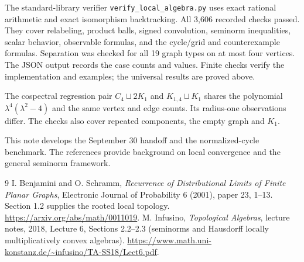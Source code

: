 \documentclass[11pt]{article}
\theoremstyle{definition}\newtheorem{definition}[theorem]{Definition}
\begin{document}
The standard-library verifier \texttt{verify\_local\_algebra.py} uses exact rational arithmetic and exact isomorphism backtracking. All 3,606 recorded checks passed. They cover relabeling, product balls, signed convolution, seminorm inequalities, scalar behavior, observable formulas, and the cycle/grid and counterexample formulas. Separation was checked for all 19 graph types on at most four vertices. The JSON output records the case counts and values. Finite checks verify the implementation and examples; the universal results are proved above.

The cospectral regression pair $C_4\sqcup2K_1$ and $K_{1,4}\sqcup K_1$ shares the polynomial $\lambda^4(\lambda^2-4)$ and the same vertex and edge counts. Its radius-one observations differ. The checks also cover repeated components, the empty graph and $K_1$.

This note develops the September 30 handoff and the normalized-cycle benchmark. The references provide background on local convergence and the general seminorm framework.

\begingroup\small
\begin{thebibliography}{9}
 I. Benjamini and O. Schramm, \emph{Recurrence of Distributional Limits of Finite Planar Graphs}, Electronic Journal of Probability 6 (2001), paper 23, 1--13. Section 1.2 supplies the rooted local topology. \url{https://arxiv.org/abs/math/0011019}.
 M. Infusino, \emph{Topological Algebras}, lecture notes, 2018, Lecture 6, Sections 2.2--2.3 (seminorms and Hausdorff locally multiplicatively convex algebras). \url{https://www.math.uni-konstanz.de/~infusino/TA-SS18/Lect6.pdf}.
\end{thebibliography}
\endgroup
\end{document}
